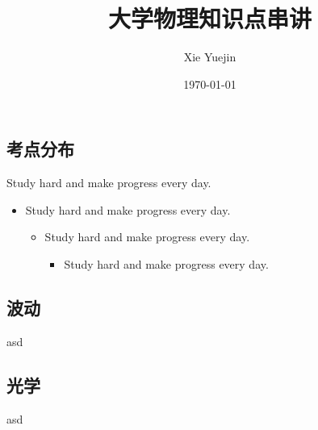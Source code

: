 \documentclass[UTF8]{ctexbeamer}
\title{大学物理知识点串讲}
\author[Xie Yuejin(Advanced Class 2201)]{Xie Yuejin}
\institute[*]{提高 2201班\\
	华中科技大学\\
	u202210333@hust.edu.cn}
\date{\today}
\begin{document}
\begin{frame}
	\begin{multicols}{2}
		\tableofcontents
	\end{multicols}
\end{frame}

\begin{frame}
\section{考点分布}
Study hard and make progress every day. %
\begin{itemize} 
	\item Study hard and make progress every day. %
	\begin{itemize}
		\item Study hard and make progress every day. %
		\begin{itemize}
			\item Study hard and make progress every day. %
		\end{itemize}
	\end{itemize}
\end{itemize}
\end{frame}

\begin{frame}
\section{波动}

asd
\end{frame}

\begin{frame}
\section{光学}

asd
\end{frame}
\end{document}
